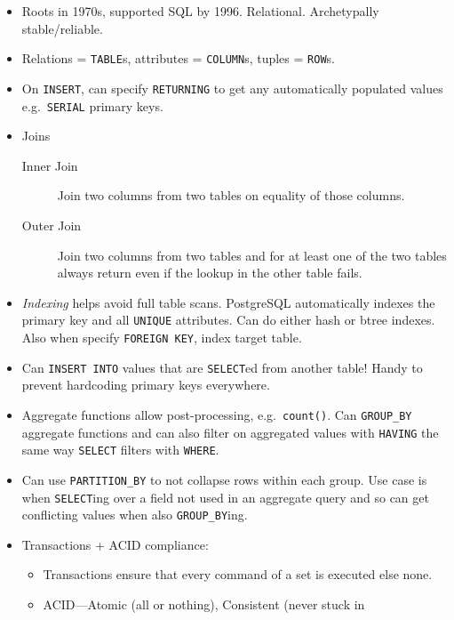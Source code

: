 \documentclass[10pt]{article}
\begin{document}
\begin{itemize}
    \item Roots in 1970s, supported SQL by 1996. Relational. Archetypally
        stable/reliable.
    \item Relations = \lstinline{TABLE}s, attributes = \lstinline{COLUMN}s,
        tuples = \lstinline{ROW}s.
    \item On \lstinline{INSERT}, can specify \lstinline{RETURNING} to get any
        automatically populated values e.g.\ \lstinline{SERIAL} primary keys.
    \item Joins
        \begin{description}
            \item[Inner Join] Join two columns from two tables on equality of
                those columns.
            \item[Outer Join] Join two columns from two tables and for at least
                one of the two tables always return even if the lookup in the
                other table fails.
        \end{description}
    \item \emph{Indexing} helps avoid full table scans. PostgreSQL automatically
        indexes the primary key and all \lstinline{UNIQUE} attributes. Can do
        either hash or btree indexes. Also when specify \lstinline{FOREIGN KEY},
        index target table.
    \item Can \lstinline{INSERT INTO} values that are \lstinline{SELECT}ed from
        another table! Handy to prevent hardcoding primary keys everywhere.
    \item Aggregate functions allow post-processing, e.g.\ \lstinline{count()}.
        Can \lstinline{GROUP_BY} aggregate functions and can also filter on
        aggregated values with \lstinline{HAVING} the same way
        \lstinline{SELECT} filters with \lstinline{WHERE}.
    \item Can use \lstinline{PARTITION_BY} to not collapse rows within each
        group. Use case is when \lstinline{SELECT}ing over a field not used in
        an aggregate query and so can get conflicting values when also
        \lstinline{GROUP_BY}ing.
    \item Transactions + ACID compliance:
        \begin{itemize}
            \item Transactions ensure that every command of a set is executed
                else none.
            \item ACID---Atomic (all or nothing), Consistent (never stuck in

\end{itemize}
\end{itemize}
\end{document}
